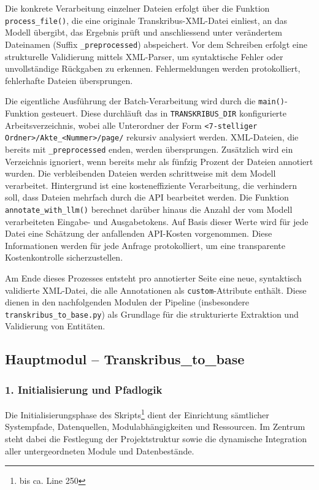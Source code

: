 \documentclass[12pt, a4paper, ngerman, bidi=default]{article}
\newcommand{\code}[1]{\colorbox{VeryLightGray}{\texttt{#1}}} %
\begin{document}
Die konkrete Verarbeitung einzelner Dateien erfolgt über die Funktion \code{process\_file()}, die eine originale Transkribus-XML-Datei einliest,
an das Modell übergibt, das Ergebnis prüft und anschliessend unter verändertem Dateinamen (Suffix \code{\_preprocessed}) abspeichert. Vor dem 
Schreiben erfolgt eine strukturelle Validierung mittels XML-Parser, um syntaktische Fehler oder unvollständige Rückgaben zu 
erkennen. Fehlermeldungen werden protokolliert, fehlerhafte Dateien übersprungen.

Die eigentliche Ausführung der Batch-Verarbeitung wird durch die \code{main()}-Funktion gesteuert. Diese durchläuft das in 
\code{TRANSKRIBUS\_DIR} konfigurierte Arbeitsverzeichnis, wobei alle Unterordner der Form \code{<7-stelliger Ordner>/Akte\_<Nummer>/page/} 
rekursiv analysiert werden. XML-Dateien, die bereits mit \code{\_preprocessed} enden, werden übersprungen. Zusätzlich wird ein Verzeichnis 
ignoriert, wenn bereits mehr als fünfzig Prozent der Dateien annotiert wurden. Die verbleibenden Dateien werden schrittweise mit dem Modell 
verarbeitet. Hintergrund ist eine kosteneffiziente Verarbeitung, die verhindern soll, dass Dateien mehrfach durch die API bearbeitet werden. Die Funktion 
\code{annotate\_with\_llm()} berechnet darüber hinaus die Anzahl der vom Modell verarbeiteten Eingabe- und Ausgabetokens. Auf Basis dieser Werte wird für 
jede Datei eine Schätzung der anfallenden API-Kosten vorgenommen. Diese Informationen werden für jede Anfrage protokolliert, um eine transparente 
Kostenkontrolle sicherzustellen.

Am Ende dieses Prozesses entsteht pro annotierter Seite eine neue, syntaktisch validierte XML-Datei, 
die alle Annotationen als \code{custom}-Attribute enthält. Diese dienen in den nachfolgenden Modulen der 
Pipeline (insbesondere \code{transkribus\_to\_base.py}) als Grundlage für die strukturierte Extraktion und Validierung von Entitäten.


\subsection{Hauptmodul -- Transkribus\_to\_base}\label{sec:transkribus_to_base}
\subsubsection*{1. Initialisierung und Pfadlogik}

Die Initialisierungsphase des Skripts\footnote{bis ca. Line 250} dient der Einrichtung sämtlicher Systempfade, Datenquellen, 
Modulabhängigkeiten und Ressourcen. Im Zentrum steht dabei die Festlegung der Projektstruktur sowie die dynamische Integration aller untergeordneten Module und Datenbestände.
\end{document}
